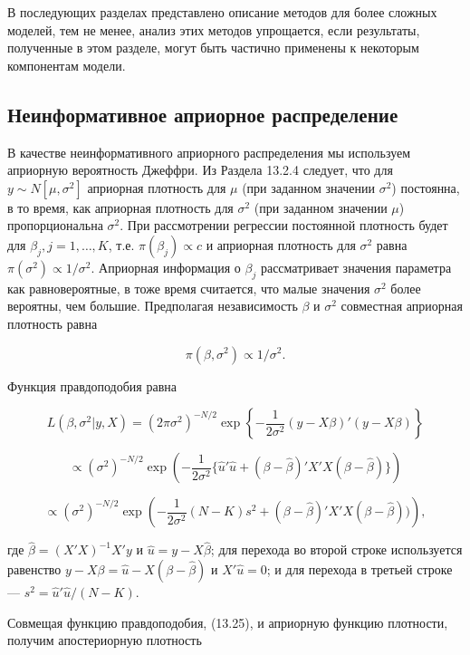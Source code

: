 В последующих разделах представлено описание методов для более сложных моделей, тем не менее, анализ этих методов упрощается, если результаты, полученные в этом разделе, могут быть частично применены к некоторым компонентам модели.

\subsection{Неинформативное априорное распределение}

В качестве неинформативного априорного распределения мы используем априорную вероятность Джеффри. Из Раздела 13.2.4 следует, что для $y{\sim}N[\mu,\sigma^{2}]$ априорная плотность для $\mu$ (при заданном значении $\sigma^{2}$) постоянна, в то время, как априорная плотность для $\sigma^{2}$ (при заданном значении $\mu$) пропорциональна $\sigma^{2}$. При рассмотрении регрессии постоянной плотность будет для $\beta_j, j=1,\ldots ,K$, т.е. $\pi(\beta_j)\propto{c}$ и априорная плотность для $\sigma^{2}$ равна $\pi(\sigma^{2})\propto{1/\sigma^{2}}$. Априорная информация о $\beta_j$ рассматривает значения параметра как равновероятные, в тоже время считается, что малые значения $\sigma^{2}$ более вероятны, чем большие. Предполагая независимость $\beta$ и $\sigma^{2}$ совместная априорная плотность равна

\[
\pi{(\beta,\sigma^{2})\propto{1/\sigma^{2}}}.
\]

Функция правдоподобия равна

\begin{equation}
L(\beta,\sigma^{2}|y,X)=(2\pi\sigma^{2})^{-N/2}\exp\left\lbrace-\dfrac{1}{2\sigma^{2}}(y-X\beta)'(y-X\beta)\right\rbrace
\end{equation}

\[
{\propto}(\sigma^{2})^{-N/2}\exp\left(-\dfrac{1}{2\sigma^{2}}\lbrace{\hat{u}'\hat{u}+(\beta-\hat{\beta})'X'X(\beta-\hat{\beta})}\rbrace\right) 
\]

\[
{\propto}(\sigma^{2})^{-N/2}\exp\left(-\dfrac{1}{2\sigma^{2}}(N-K)s^2+(\beta-\hat{\beta})'X'X(\beta-\hat{\beta}))\right),
\]

где $\hat{\beta}=(X'X)^{-1}X'y$ и $\hat{u}=y-X\hat{\beta}$; для перехода во второй строке используется равенство $y-X\beta=\hat{u}-X(\beta-\hat{\beta})$ и $X'\hat{u}=0$; и для перехода в третьей строке --- $s^2=\hat{u}'\hat{u}/(N-K)$.

Совмещая функцию  правдоподобия, (13.25), и априорную функцию плотности, получим апостериорную плотность

